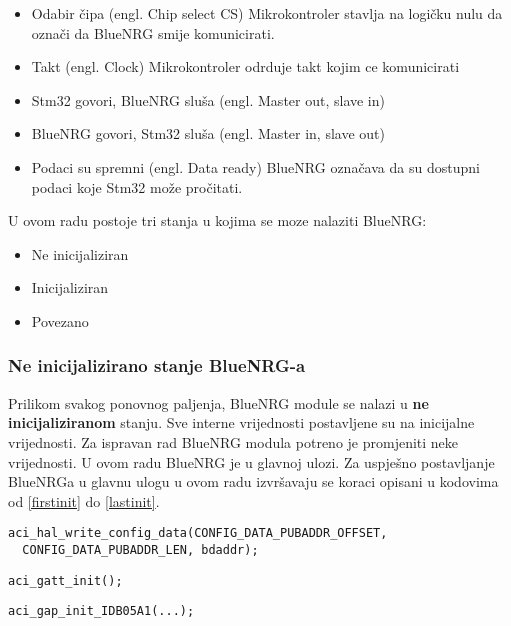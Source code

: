 \documentclass[times, utf8, diplomski]{diplomski}
\begin{document}
\begin{itemize}
  \item Odabir čipa (engl. Chip select CS) Mikrokontroler stavlja na logičku nulu da označi da BlueNRG smije komunicirati.
  \item Takt (engl. Clock) Mikrokontroler odrduje takt kojim ce komunicirati
  \item Stm32 govori, BlueNRG sluša (engl. Master out, slave in)
  \item BlueNRG govori, Stm32 sluša (engl. Master in, slave out)
  \item Podaci su spremni (engl. Data ready) BlueNRG označava da su dostupni podaci koje Stm32 može pročitati.
\end{itemize}

U ovom radu postoje tri stanja u kojima se moze nalaziti BlueNRG:

\begin{itemize}
  \item Ne inicijaliziran
  \item Inicijaliziran
  \item Povezano
\end{itemize}

\subsubsection{Ne inicijalizirano stanje BlueNRG-a}
Prilikom svakog ponovnog paljenja, BlueNRG module se nalazi u \textbf{ne inicijaliziranom} stanju. Sve interne vrijednosti postavljene su na inicijalne vrijednosti. Za ispravan rad BlueNRG modula potreno je promjeniti neke vrijednosti. U ovom radu BlueNRG je u glavnoj ulozi. Za uspješno postavljanje BlueNRGa u glavnu ulogu u ovom radu izvršavaju se koraci opisani u kodovima od \ref{firstinit} do \ref{lastinit}.

\begin{lstlisting}[caption={Postavi MAC adresu}, label={firstinit}]
aci_hal_write_config_data(CONFIG_DATA_PUBADDR_OFFSET,
  CONFIG_DATA_PUBADDR_LEN, bdaddr);
\end{lstlisting}

\begin{lstlisting}[caption={Inicijaliziraj gatt podsustav}]
aci_gatt_init();
\end{lstlisting}

\begin{lstlisting}[caption={Inicijaliziraj gap podsustav}]
aci_gap_init_IDB05A1(...);
\end{lstlisting}
\end{document}
